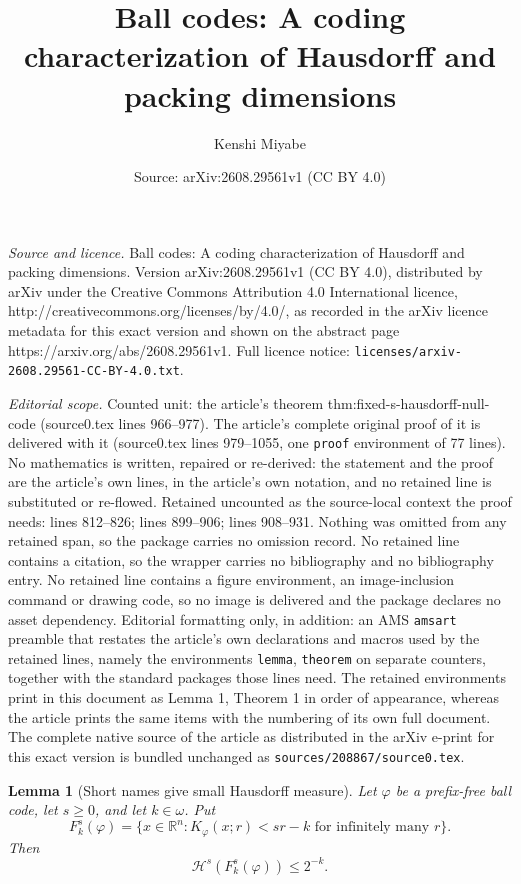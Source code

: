 \documentclass[10pt,a4paper]{amsart}
\title{Ball codes: A coding characterization of Hausdorff and packing dimensions}
\author{Kenshi Miyabe}
\date{Source: arXiv:2608.29561v1 (CC BY 4.0)}
\newtheorem{lemma}{Lemma}
\begin{document}
\maketitle

\noindent\emph{Source and licence.} Ball codes: A coding characterization of Hausdorff and packing dimensions. Version arXiv:2608.29561v1 (CC BY 4.0), distributed by arXiv under the Creative Commons Attribution 4.0 International licence, http://creativecommons.org/licenses/by/4.0/, as recorded in the arXiv licence metadata for this exact version and shown on the abstract page https://arxiv.org/abs/2608.29561v1. Full licence notice: \texttt{licenses/arxiv-2608.29561-CC-BY-4.0.txt}.\par\smallskip

\noindent\textit{Editorial scope.} Counted unit: the article's theorem thm:fixed-s-hausdorff-null-code (source0.tex lines 966--977). The article's complete original proof of it is delivered with it (source0.tex lines 979--1055, one \texttt{proof} environment of 77 lines). No mathematics is written, repaired or re-derived: the statement and the proof are the article's own lines, in the article's own notation, and no retained line is substituted or re-flowed.  Retained uncounted as the source-local context the proof needs: lines 812--826; lines 899--906; lines 908--931.  Nothing was omitted from any retained span, so the package carries no omission record.  No retained line contains a citation, so the wrapper carries no bibliography and no bibliography entry.  No retained line contains a figure environment, an image-inclusion command or drawing code, so no image is delivered and the package declares no asset dependency.  Editorial formatting only, in addition: an AMS \texttt{amsart} preamble that restates the article's own declarations and macros used by the retained lines, namely the environments \texttt{lemma}, \texttt{theorem} on separate counters, together with the standard packages those lines need.  The retained environments print in this document as Lemma 1, Theorem 1 in order of appearance, whereas the article prints the same items with the numbering of its own full document.  The complete native source of the article as distributed in the arXiv e-print for this exact version is bundled unchanged as \texttt{sources/208867/source0.tex}.
\begin{lemma}[Short names give small Hausdorff measure]
\label{lem:short-names-small-measure}
Let \(\varphi\) be a prefix-free ball code, let \(s\ge0\), and let
\(k\in\omega\).  Put
\[
F_k^s(\varphi)
=
\bigl\{x\in\mathbb R^n:
K_\varphi(x;r)<sr-k\text{ for infinitely many }r\bigr\}.
\]
Then
\[
\mathcal H^s(F_k^s(\varphi))\le 2^{-k}.
\]
\end{lemma}
\end{document}
